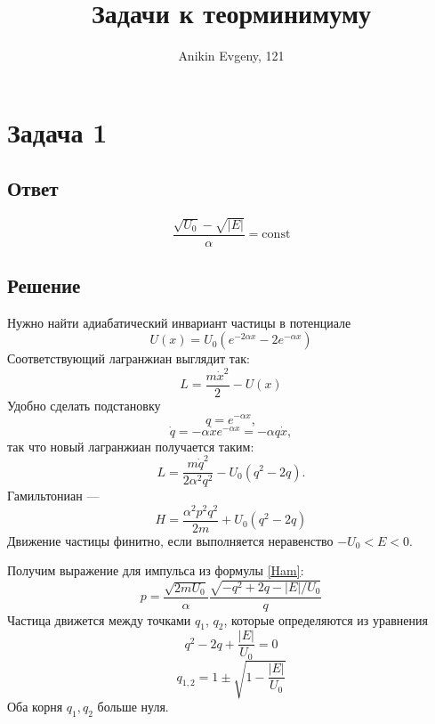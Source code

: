\documentclass{article}
\title{Задачи к теорминимуму}
\author{Anikin Evgeny, 121}
\begin{document}
\maketitle
\section{Задача 1}
	\subsection{Ответ}
	\begin{equation}
		\frac{\sqrt{U_0} - \sqrt{|E|}}{\alpha} = \mathrm{const} 
	\end{equation}
	\subsection{Решение}
	Нужно найти адиабатический инвариант частицы в потенциале
	\begin{equation}
		U(x) = U_0 ( e^{-2\alpha x} - 2 e^{-\alpha x})
	\end{equation}
	Соответствующий лагранжиан выглядит так:
	\begin{equation}
		L = \frac{m\dot{x}^2}{2} - U(x)
	\end{equation}
	Удобно сделать подстановку
	\begin{equation}
		q = e^{-\alpha x} ,
	\end{equation}
	\begin{equation}
		\dot{q} = -\alpha \dot{x} e^{-\alpha x} = - \alpha q \dot{x},
	\end{equation}
	так что новый лагранжиан получается таким:
	\begin{equation}
		L = \frac{m\dot{q}^2}{2\alpha^2 q^2} - U_0( q^2 - 2 q ). 
	\end{equation}
	Гамильтониан ---
	\begin{equation}
		\label{Ham}
		H = \frac{\alpha^2 p^2 q^2}{2m} + U_0(q^2 - 2q)
	\end{equation}
	Движение частицы финитно, если выполняется неравенство
	$-U_0 < E < 0$. 

	Получим выражение для импульса из формулы \ref{Ham}:
	\begin{equation}
		p = \frac{\sqrt{2mU_0}}
		{\alpha} \frac{\sqrt{-q^2 + 2q - |E|/U_0}}{q}
	\end{equation}
	Частица движется между точками $q_1$, $q_2$, которые определяются из уравнения 
	\begin{equation}
		q^2 - 2q + \frac{|E|}{U_0} = 0
	\end{equation}
	\begin{equation}
		q_{1,2} = 1 \pm \sqrt{1 - \frac{|E|}{U_0}}
	\end{equation}
	Оба корня $q_1, q_2$ больше нуля.
	
\end{document}
